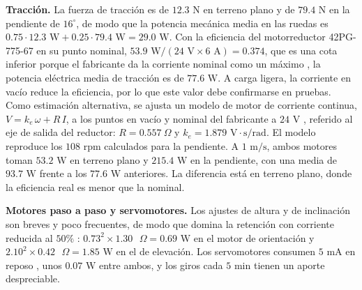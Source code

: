 \documentclass[../../General.tex]{subfiles}
\begin{document}
\textbf{Tracción.} La fuerza de tracción es de $12.3\text{ N}$ en terreno plano y de $79.4\text{ N}$ en la pendiente de $16^\circ$, de modo que la potencia mecánica media en las ruedas es $0.75 \cdot 12.3\text{ W} + 0.25 \cdot 79.4\text{ W} = 29.0\text{ W}$. Con la eficiencia del motorreductor 42PG-775-67 en su punto nominal, $53.9\text{ W}/(24\text{ V} \times 6\text{ A}) = 0.374$, que es una cota inferior porque el fabricante da la corriente nominal como un máximo \citep{motor_42pg775}, la potencia eléctrica media de tracción es de $77.6\text{ W}$. A carga ligera, la corriente en vacío reduce la eficiencia, por lo que este valor debe confirmarse en pruebas. Como estimación alternativa, se ajusta un modelo de motor de corriente continua, $V = k_e\,\omega + R\,I$, a los puntos en vacío y nominal del fabricante a $24\text{ V}$ \citep{motor_42pg775}, referido al eje de salida del reductor: $R = 0.557\ \Omega$ y $k_e = 1.879\text{ V}\cdot\text{s/rad}$. El modelo reproduce los $108\text{ rpm}$ calculados para la pendiente. A $1\text{ m/s}$, ambos motores toman $53.2\text{ W}$ en terreno plano y $215.4\text{ W}$ en la pendiente, con una media de $93.7\text{ W}$ frente a los $77.6\text{ W}$ anteriores. La diferencia está en terreno plano, donde la eficiencia real es menor que la nominal.

\textbf{Motores paso a paso y servomotores.} Los ajustes de altura y de inclinación son breves y poco frecuentes, de modo que domina la retención con corriente reducida al $50\%$ \citep{leadshine_dm542}: $0.73^2 \times 1.30\text{ }\Omega = 0.69\text{ W}$ en el motor de orientación y $2.10^2 \times 0.42\text{ }\Omega = 1.85\text{ W}$ en el de elevación. Los servomotores consumen $5\text{ mA}$ en reposo \citep{dsservo_rds3225}, unos $0.07\text{ W}$ entre ambos, y los giros cada $5\text{ min}$ tienen un aporte despreciable.
\end{document}
